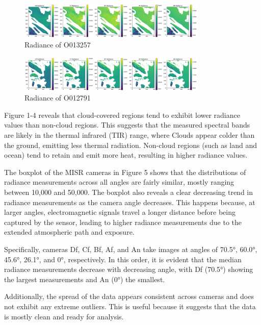 \documentclass[10pt,letterpaper]{article}
\begin{document}
\begin{figure}[H]
    \centering
    \includegraphics[width=0.8\textwidth]{radiance_O013257.png}
    \caption{Radiance of O013257}
    \label{Figure 3}
\end{figure}

\begin{figure}[H]
    \centering
    \includegraphics[width=0.8\textwidth]{radiance_O012791.png}
    \caption{Radiance of O012791}
    \label{Figure 4}
\end{figure}

Figure 1-4 reveals that cloud-covered regions tend to exhibit lower radiance values than non-cloud regions. This suggests that the measured spectral bands are likely in the thermal infrared (TIR) range,  where Clouds appear colder than the ground, emitting less thermal radiation. Non-cloud regions (such as land and ocean) tend to retain and emit more heat, resulting in higher radiance values.

The boxplot of the MISR cameras in Figure 5 shows that the distributions of radiance measurements across all angles are fairly similar, mostly ranging between 10,000 and 50,000. The boxplot also reveals a clear decreasing trend in radiance measurements as the camera angle decreases. This happens because, at larger angles, electromagnetic signals travel a longer distance before being captured by the sensor, leading to higher radiance measurements due to the extended atmospheric path and exposure.

Specifically, cameras Df, Cf, Bf, Af, and An take images at angles of 70.5°, 60.0°, 45.6°, 26.1°, and 0°, respectively. In this order, it is evident that the median radiance measurements decrease with decreasing angle, with Df (70.5°) showing the largest measurements and An (0°) the smallest.

Additionally, the spread of the data appears consistent across cameras and does not exhibit any extreme outliers. This is useful because it suggests that the data is mostly clean and ready for analysis.
\end{document}
